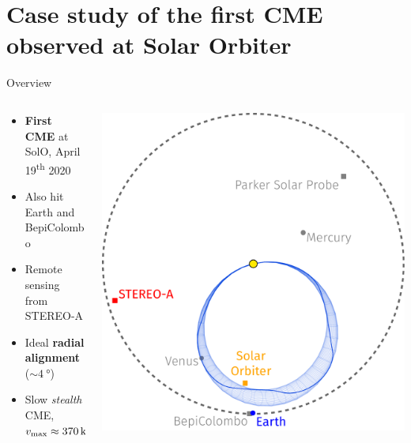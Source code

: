 \documentclass[10pt,aspectratio=169,usenames,dvipsnames]{beamer}
\newcommand{\maxt}{\ensuremath\text{max}}
\begin{document}
\section{Case study of the first CME observed at Solar Orbiter}

\begin{frame}{Overview}
    \begin{columns}
        \begin{column}{0.4\textwidth}
            \begin{itemize}
                \item \textbf{First CME} at SolO, April 19\textsuperscript{th} 2020
                \item Also hit Earth and BepiColombo
                \item Remote sensing from STEREO-A
                \item Ideal \textbf{radial alignment} ($\sim\SI{4}{\degree}$)
                \item Slow \textit{stealth} CME, $v_\maxt \approx \SI{370}{\kilo\meter\per\second}$
            \end{itemize}
        \end{column}
        \begin{column}{0.5\textwidth}
        	\vskip2mm
            \includegraphics[width=\textwidth]{plots/3dcore_visual_davies_new_panela.pdf}
        \end{column}
    \end{columns}
\end{frame}
\end{document}
